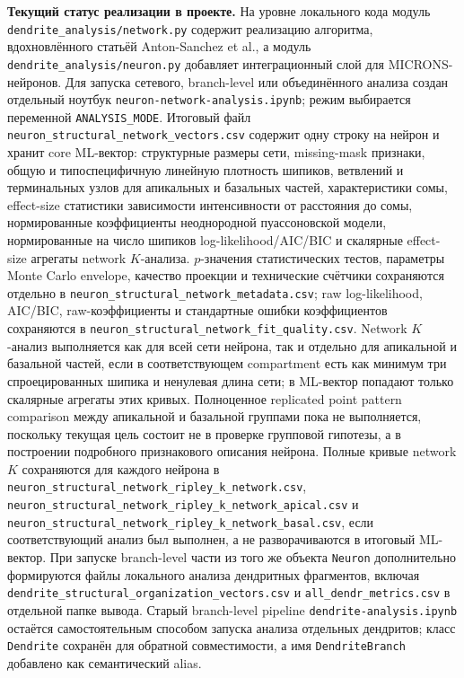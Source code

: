 \documentclass[12pt,a4paper]{article}
\begin{document}
\noindent\textbf{Текущий статус реализации в проекте.}
На уровне локального кода модуль \texttt{dendrite\_analysis/network.py} содержит реализацию алгоритма, вдохновлённого статьёй Anton-Sanchez et al., а модуль \texttt{dendrite\_analysis/neuron.py} добавляет интеграционный слой для MICRONS-нейронов. Для запуска сетевого, branch-level или объединённого анализа создан отдельный ноутбук \texttt{neuron-network-analysis.ipynb}; режим выбирается переменной \texttt{ANALYSIS\_MODE}. Итоговый файл \texttt{neuron\_structural\_network\_vectors.csv} содержит одну строку на нейрон и хранит core ML-вектор: структурные размеры сети, missing-mask признаки, общую и типоспецифичную линейную плотность шипиков, ветвлений и терминальных узлов для апикальных и базальных частей, характеристики сомы, effect-size статистики зависимости интенсивности от расстояния до сомы, нормированные коэффициенты неоднородной пуассоновской модели, нормированные на число шипиков log-likelihood/AIC/BIC и скалярные effect-size агрегаты network \(K\)-анализа. \(p\)-значения статистических тестов, параметры Monte Carlo envelope, качество проекции и технические счётчики сохраняются отдельно в \texttt{neuron\_structural\_network\_metadata.csv}; raw log-likelihood, AIC/BIC, raw-коэффициенты и стандартные ошибки коэффициентов сохраняются в \texttt{neuron\_structural\_network\_fit\_quality.csv}. Network \(K\)-анализ выполняется как для всей сети нейрона, так и отдельно для апикальной и базальной частей, если в соответствующем compartment есть как минимум три спроецированных шипика и ненулевая длина сети; в ML-вектор попадают только скалярные агрегаты этих кривых. Полноценное replicated point pattern comparison между апикальной и базальной группами пока не выполняется, поскольку текущая цель состоит не в проверке групповой гипотезы, а в построении подробного признакового описания нейрона. Полные кривые network \(K\) сохраняются для каждого нейрона в \texttt{neuron\_structural\_network\_ripley\_k\_network.csv}, \texttt{neuron\_structural\_network\_ripley\_k\_network\_apical.csv} и \texttt{neuron\_structural\_network\_ripley\_k\_network\_basal.csv}, если соответствующий анализ был выполнен, а не разворачиваются в итоговый ML-вектор. При запуске branch-level части из того же объекта \texttt{Neuron} дополнительно формируются файлы локального анализа дендритных фрагментов, включая \texttt{dendrite\_structural\_organization\_vectors.csv} и \texttt{all\_dendr\_metrics.csv} в отдельной папке вывода. Старый branch-level pipeline \texttt{dendrite-analysis.ipynb} остаётся самостоятельным способом запуска анализа отдельных дендритов; класс \texttt{Dendrite} сохранён для обратной совместимости, а имя \texttt{DendriteBranch} добавлено как семантический alias.
\end{document}

